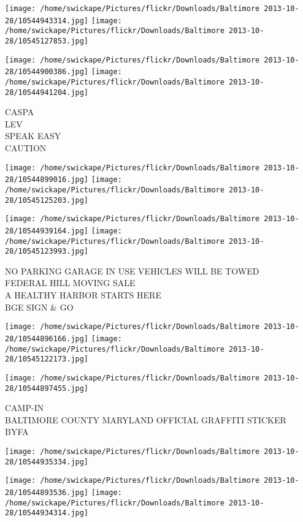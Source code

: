 \documentclass[10pt,letterpaper]{article}
\begin{document}
\texttt{[image: /home/swickape/Pictures/flickr/Downloads/Baltimore 2013-10-28/10544943314.jpg]}
\texttt{[image: /home/swickape/Pictures/flickr/Downloads/Baltimore 2013-10-28/10545127853.jpg]}

\texttt{[image: /home/swickape/Pictures/flickr/Downloads/Baltimore 2013-10-28/10544900386.jpg]}
\texttt{[image: /home/swickape/Pictures/flickr/Downloads/Baltimore 2013-10-28/10544941204.jpg]}

CASPA\\
LEV\\
SPEAK EASY\\
CAUTION\\
\pagebreak

\texttt{[image: /home/swickape/Pictures/flickr/Downloads/Baltimore 2013-10-28/10544899016.jpg]}
\texttt{[image: /home/swickape/Pictures/flickr/Downloads/Baltimore 2013-10-28/10545125203.jpg]}

\texttt{[image: /home/swickape/Pictures/flickr/Downloads/Baltimore 2013-10-28/10544939164.jpg]}
\texttt{[image: /home/swickape/Pictures/flickr/Downloads/Baltimore 2013-10-28/10545123993.jpg]}

NO PARKING GARAGE IN USE VEHICLES WILL BE TOWED\\
FEDERAL HILL MOVING SALE\\
A HEALTHY HARBOR STARTS HERE\\
BGE SIGN \& GO\\
\pagebreak

\texttt{[image: /home/swickape/Pictures/flickr/Downloads/Baltimore 2013-10-28/10544896166.jpg]}
\texttt{[image: /home/swickape/Pictures/flickr/Downloads/Baltimore 2013-10-28/10545122173.jpg]}

\vspace{0.25in}
\texttt{[image: /home/swickape/Pictures/flickr/Downloads/Baltimore 2013-10-28/10544897455.jpg]}

CAMP{-}IN\\
BALTIMORE COUNTY MARYLAND OFFICIAL GRAFFITI STICKER\\
BYFA\\
\pagebreak

\texttt{[image: /home/swickape/Pictures/flickr/Downloads/Baltimore 2013-10-28/10544935334.jpg]}

\vspace{0.25in}
\texttt{[image: /home/swickape/Pictures/flickr/Downloads/Baltimore 2013-10-28/10544893536.jpg]}
\texttt{[image: /home/swickape/Pictures/flickr/Downloads/Baltimore 2013-10-28/10544934314.jpg]}
\end{document}
